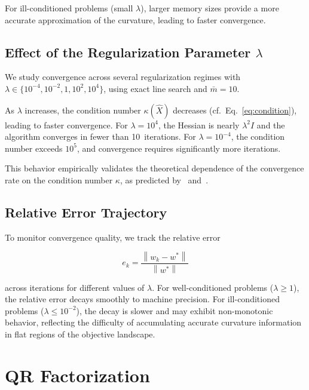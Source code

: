 \documentclass[11pt,a4paper]{article}
\newcommand{\norm}[1]{\left\|#1\right\|}
\newcommand{\Xhat}{\hat{X}}
\begin{document}
For ill-conditioned problems (small $\lambda$), larger memory sizes provide a more 
accurate approximation of the curvature, leading to faster convergence.



\subsection{Effect of the Regularization Parameter \texorpdfstring{$\lambda$}{lambda}}
\label{sec:lambda_effect}

We study convergence across several regularization regimes with 
$\lambda \in \{10^{-4}, 10^{-2}, 1, 10^2, 10^4\}$, using exact line search and 
$\bar{m} = 10$.

As $\lambda$ increases, the condition number $\kappa(\Xhat)$ decreases 
(cf.\ Eq.~\eqref{eq:condition}), leading to faster convergence. For $\lambda = 10^4$, 
the Hessian is nearly $\lambda^2 I$ and the algorithm converges in fewer than 10~iterations. 
For $\lambda = 10^{-4}$, the condition number exceeds $10^5$, and convergence requires 
significantly more iterations.

This behavior empirically validates the theoretical dependence of the convergence rate 
on the condition number $\kappa$, as predicted by~\cite{rodomanov2021} and~\cite{jin2022}.



\subsection{Relative Error Trajectory}

To monitor convergence quality, we track the relative error

\begin{equation}
    e_k = \frac{\norm{w_k - w^*}}{\norm{w^*}}
\end{equation}

across iterations for different values of $\lambda$. For well-conditioned problems 
($\lambda \geq 1$), the relative error decays smoothly to machine precision. 
For ill-conditioned problems ($\lambda \leq 10^{-2}$), the decay is slower and may 
exhibit non-monotonic behavior, reflecting the difficulty of accumulating accurate 
curvature information in flat regions of the objective landscape.


\section{QR Factorization}
\label{sec:qr}
\end{document}

